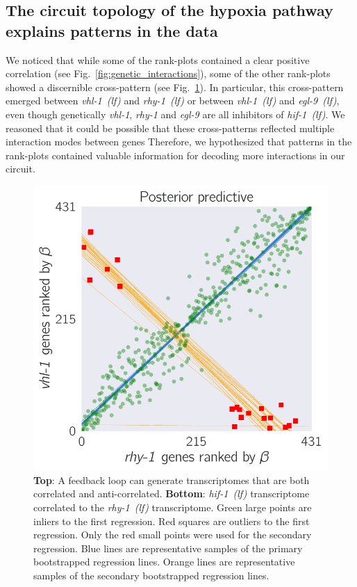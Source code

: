 \documentclass[9pt,twocolumn,twoside]{pnas-new}
\newcommand{\gene}[1]{\emph{#1}}
\newcommand{\egl}{\emph{egl-9~(lf)}}
\newcommand{\rhy}{\emph{rhy-1~(lf)}}
\newcommand{\vhl}{\emph{vhl-1~(lf)}}
\newcommand{\hif}{\emph{hif-1~(lf)}}
\begin{document}
\subsection*{The circuit topology of the hypoxia pathway explains patterns in
            the data}
\label{sub:topology}
We noticed that while some of the rank-plots contained a clear positive correlation
(see Fig.~\ref{fig:genetic_interactions}), some of the other rank-plots showed
a discernible cross-pattern (see Fig.~\ref{fig:xpattern}). In particular, this
cross-pattern emerged between \vhl{} and \rhy{} or between \vhl{} and \egl{},
even though genetically \gene{vhl-1}, \gene{rhy-1} and \gene{egl-9} are all
inhibitors of \hif{}. We reasoned that it could be possible that these
cross-patterns reflected multiple interaction modes between genes
Therefore, we hypothesized that patterns in the rank-plots contained
valuable information for decoding more interactions in our circuit.

\begin{figure}[tbhp]
\centering
\includegraphics[width=\linewidth]{figs/multiplemodes-ed.pdf}
\caption{
\textbf{Top}: A feedback loop can generate transcriptomes that are both
correlated and anti-correlated. \textbf{Bottom}: \hif{} transcriptome correlated
to the \rhy{} transcriptome. Green large points are inliers to the first
regression. Red squares are outliers to the first regression. Only the red
small points were used for the secondary regression. Blue lines are representative
samples of the primary bootstrapped regression lines. Orange lines are
representative samples of the secondary bootstrapped regression lines.
}
\label{fig:xpattern}
\end{figure}
\end{document}
